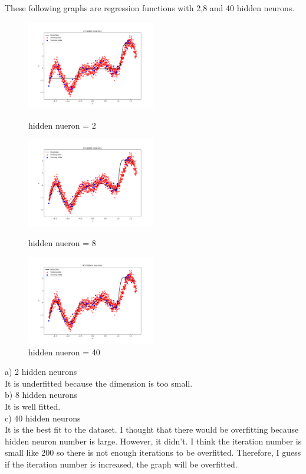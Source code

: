 \documentclass[a4paper]{article}
\begin{document}
These following graphs are regression functions with 2,8 and 40 hidden neurons.\\
\begin{figure}[h]
  \includegraphics[width=0.5\textwidth]{ex_1_1_a_2.png}
  \caption{hidden nueron = 2}
  \includegraphics[width=0.5\textwidth]{ex_1_1_a_8.png}
  \caption{hidden nueron = 8}
  \includegraphics[width=0.5\textwidth]{ex_1_1_a_40.png}
  \caption{hidden nueron = 40}
\end{figure}

\noindent
a) 2 hidden neurons \\
It is underfitted because the dimension is too small.\\

\noindent
b) 8 hidden neurons\\
It is well fitted. \\

\noindent
c) 40 hidden neurons \\
It is the best fit to the dataset. I thought that there would be overfitting because hidden neuron number is large. However, it didn't. I think the iteration number is small like 200 so there is not enough iterations to be overfitted. Therefore, I guess if the iteration number is increased, the graph will be overfitted.\\
\end{document}
